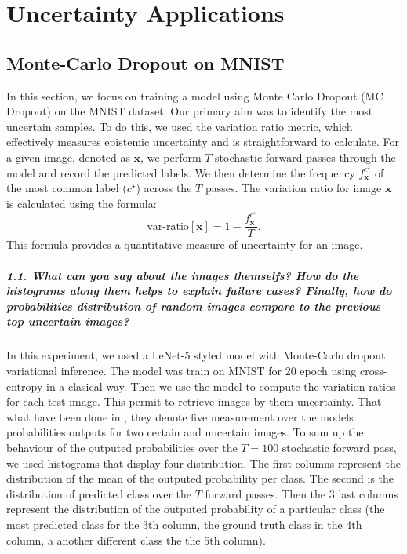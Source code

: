 \graphicspath{{figs/3c}}

\chapter{Uncertainty Applications}


\section{Monte-Carlo Dropout on MNIST}
In this section, we focus on training a model using Monte Carlo Dropout (MC Dropout) on the MNIST dataset. Our primary aim was to identify the most uncertain samples. To do this, we used the variation ratio metric, which effectively measures epistemic uncertainty and is straightforward to calculate. For a given image, denoted as $ \mathbf{x} $, we perform $ T $ stochastic forward passes through the model and record the predicted labels. We then determine the frequency $ f^{c^\star }_\mathbf{x} $ of the most common label ($ c^\star $) across the $ T $ passes. The variation ratio for image $ \mathbf{x} $ is calculated using the formula:
\[
    \text{var-ratio}[\mathbf{x}] = 1 - \frac{f^{c^\star }_\mathbf{x}}{T}
.\]
This formula provides a quantitative measure of uncertainty for an image.


\paragraph*{1.1. What can you say about the images themselfs? How do the histograms along them helps to explain failure cases? Finally, how do probabilities distribution of random images compare to the previous top uncertain images?}

In this experiment, we used a LeNet-5 styled model with Monte-Carlo dropout variational inference. The model was train on MNIST for 20 epoch using cross-entropy in a clasical way. Then we use the model to compute the variation ratios for each test image. This permit to retrieve images by them uncertainty. That what have been done in , they denote five measurement over the models probabilities outputs for two certain and uncertain images. To sum up the behaviour of the outputed probabilities over the $ T=100 $ stochastic forward pass, we used histograms that display four distribution.
The first columns represent the distribution of the mean of the outputed probability per class.
The second is the distribution of predicted class over the $ T $ forward passes.
Then the 3 last columns represent the distribution of the outputed probability of a particular class (the most predicted class for the 3th column, the ground truth class in the 4th column, a another different class the the 5th column).

